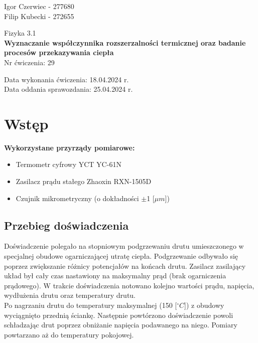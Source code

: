 \documentclass[11pt]{article}
\begin{document}
    \begin{flushright}
        \large{
            Igor Czerwiec - 277680\\
            Filip Kubecki - 272655
        }\\
    \end{flushright}
    \begin{center}
        \large{Fizyka 3.1}\\
        \vspace{2mm}
        \LARGE{\textbf{Wyznaczanie współczynnika rozszerzalności termicznej oraz badanie procesów przekazywania ciepła}}\\
        \vspace{3mm}
        \huge{Nr ćwiczenia: 29}\\
        \vspace{1cm}
    \end{center}
    \begin{flushright}
        \large{
            Data wykonania ćwiczenia: 18.04.2024 r.\\
            Data oddania sprawozdania: 25.04.2024 r.
        }\\
    \end{flushright}
    \vspace{1cm}
    \section{Wstęp}
    \textbf{Wykorzystane przyrządy pomiarowe:}
    \begin{itemize}
        \itemsep0em
        \item Termometr cyfrowy YCT YC-61N
        \item Zasilacz prądu stałego Zhaoxin RXN-1505D
        \item Czujnik mikrometryczny (o dokładności $\pm$1 [${\mu}m$])
    \end{itemize}
    \subsection*{Przebieg doświadczenia}
    Doświadczenie polegało na stopniowym podgrzewaniu drutu umieszczonego w specjalnej obudowe ogarniczającej utratę ciepła.
    Podgrzewanie odbywało się poprzez
    zwiększanie różnicy potencjałów na końcach drutu. Zasilacz zasilający układ był cały czas nastawiony na maksymalny prąd (brak ogarniczenia prądowego).
    W trakcie doświadczenia notowano kolejno wartości prądu, napięcia, wydłużenia drutu oraz temperatury drutu.\\
    \indent Po nagrzaniu drutu do temperatury maksymalnej (150 [${^\circ}C$]) z obudowy wyciągnięto przednią ściankę. Następnie powtórzono doświadczenie
    powoli schładzając drut poprzez obniżanie napięcia podawanego na niego. Pomiary powtarzano aż do temperatury pokojowej.
    
\end{document}
